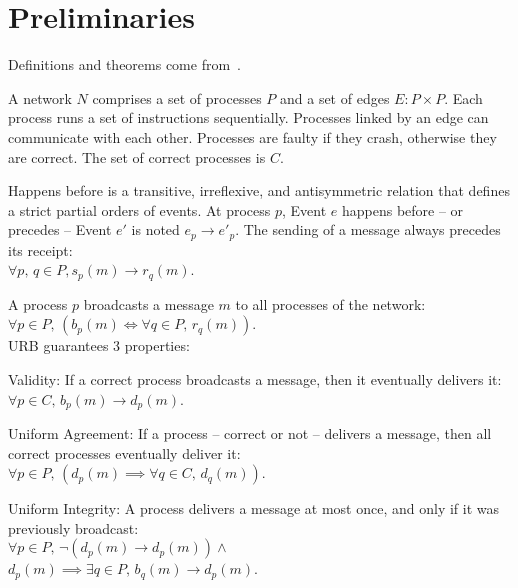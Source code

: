 
\section{Preliminaries}
\label{sec:preliminaries}

Definitions and theorems come from~\cite{hadzilacos1994modular}.

\begin{definition}[Network]
  A network $N$ comprises a set of processes $P$ and a set of edges
  $E: P \times P$. Each process runs a set of instructions
  sequentially. Processes linked by an edge can communicate with each
  other. Processes are faulty if they crash, otherwise they are correct. The set
  of correct processes is $C$.
\end{definition}


\begin{definition}
  Happens before is a transitive, irreflexive, and antisymmetric relation that
  defines a strict partial orders of events. At process $p$, Event $e$ happens
  before -- or precedes -- Event $e'$ is noted $e_p \rightarrow e'_p$. The
  sending of a message always precedes its receipt: \\
  $\forall p,\,q \in P, s_p(m) \rightarrow r_q(m)$.
\end{definition}

\begin{definition}
  A process $p$ broadcasts a message $m$ to all processes of the network: \\
  $\forall p \in P,\, (b_p(m) \Leftrightarrow \forall q \in P,\, r_q(m))$. \\ URB guarantees 3 properties: 

  \begin{asparadesc}
  \item [Validity:] If a correct process broadcasts a message, then it eventually
    delivers it: $\forall p \in C,\, b_p(m) \rightarrow d_p(m)$.
  \item [Uniform Agreement:] If a process -- correct or not -- delivers a message,
    then all correct processes eventually deliver it:\\
    $\forall p \in P,\, (d_p(m) \implies \forall q \in C,\, d_q(m))$.
  \item [Uniform Integrity:] A process delivers a message at most once, and
    only if it was previously broadcast:\\
    $\forall p \in P,\, \neg(d_p(m) \rightarrow d_p(m)) \wedge$\\$d_p(m)
    \implies \exists q \in P,\, b_q(m) \rightarrow d_p(m)$.
\end{asparadesc}

\end{definition}



